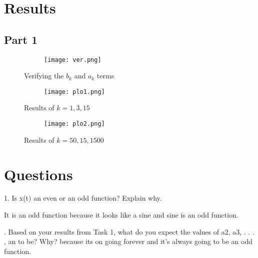 \documentclass[12pt,a4paper]{article}
\begin{document}
\clearpage

\section{Results}\label{sec:res}

\subsection{Part 1}




\begin{figure}[h]
\centering
\begin{subfigure}{ 1\textwidth}
\texttt{[image: ver.png]}
\end{subfigure}
\caption{ Verifying the $b_k$ and $a_k$ terms  }
\label{fig2:image22}
\end{figure}


\begin{figure}[h]
\centering
\begin{subfigure}{ 1\textwidth}
\texttt{[image: plo1.png]}
\end{subfigure}
\caption{ Results of $k=1,3,15$ }
\label{fig2:image22}
\end{figure}

\begin{figure}[h]
\centering
\begin{subfigure}{ 1\textwidth}
\texttt{[image: plo2.png]}
\end{subfigure}
\caption{ Results of $k=50,15,1500$ }
\label{fig2:image22}
\end{figure}
\clearpage






\section{Questions}\label{sec:res}

1. Is x(t) an even or an odd function? Explain why. \newline

\noindent  It is an odd function because it looks like a sine and sine is an odd function.

. Based on your results from Task 1, what do you expect the values of a2, a3, . . . , an to be?
Why? \newline 
{} because its on going forever and it's always going to be an odd function.
\end{document}
